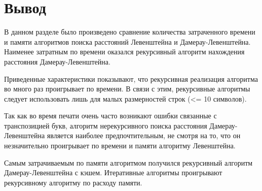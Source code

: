 \section{Вывод}

В данном разделе было произведено сравнение количества затраченного времени 
и памяти алгоритмов поиска расстояний Левенштейна и Дамерау-Левенштейна. 
Наименее затратным по времени оказался рекурсивный алгоритм нахождения расстояния 
Дамерау-Левенштейна.

Приведенные характеристики показывают, что рекурсивная реализация алгоритма 
во много раз проигрывает по времени. В связи с этим, рекурсивные алгоритмы следует 
использовать лишь для малых размерностей строк (<= 10 символов).

Так как во время печати очень часто возникают ошибки связанные с 
транспозицией букв, алгоритм нерекурсивного поиска расстояния Дамерау-Левенштейна 
является наиболее предпочтительным, не смотря на то, что он незначительно 
проигрывает по времени и памяти алгоритму Левенштейна.

Самым затрачиваемым по памяти алгоритмом получился рекурсивный алгоритм Дамерау-Левенштейна с кэшем.
Итеративные алгоритмы проигрывают рекурсивному алгоритму по расходу памяти.


